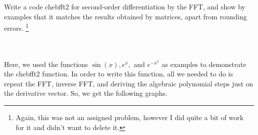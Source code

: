 Write a code chebfft2 for second-order differentiation by the FFT, and show by examples that it matches
the results obtained by matrices, apart from rounding errors.
\footnote{Again, this was not an assigned problem, however I did quite a bit of work for it and didn't
want to delete it.}\\\\

\begin{solution}\renewcommand{\qedsymbol}{}\ \\
    Here, we used the functions $\sin(x), e^x,$ and $e^{-x^2}$ as examples to demonstrate the chebfft2
    function. In order to write this function, all we needed to do is repeat the FFT, inverse FFT, and
    deriving the algebraic polynomial steps just on the derivative vector. So, we get the following
    graphs.


\end{solution}
